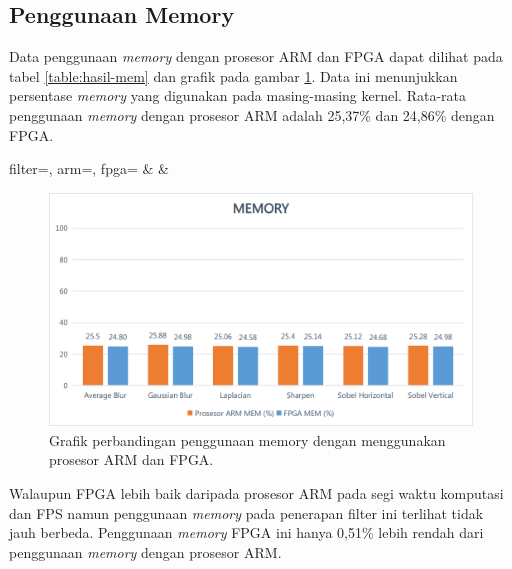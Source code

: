\subsection{Penggunaan Memory}
Data penggunaan \textit{memory} dengan prosesor ARM dan FPGA dapat dilihat pada tabel \ref{table:hasil-mem} dan grafik pada gambar \ref{fig:chart-mem}. Data ini menunjukkan persentase \textit{memory} yang digunakan pada masing-masing kernel. Rata-rata penggunaan \textit{memory} dengan prosesor ARM adalah 25,37\% dan 24,86\% dengan FPGA. 
\begin{atable}
    \caption{Tabel perbandingan penggunaan memory dengan menggunakan prosesor ARM dan FPGA.}
    \label{table:hasil-mem}
        {
            filter=\filter, 
            arm=\arm, 
            fpga=\fpga}
        {
            \filter & 
            \arm & 
            \fpga }
\end{atable}
\begin{figure}[H]
    \includegraphics[width=0.81\linewidth, center]{images/chart/chart-mem.png}
    \caption{Grafik perbandingan penggunaan memory dengan menggunakan prosesor ARM dan FPGA.}
    \label{fig:chart-mem}
\end{figure}
Walaupun FPGA lebih baik daripada prosesor ARM pada segi waktu komputasi dan FPS namun penggunaan \textit{memory} pada penerapan filter ini terlihat tidak jauh berbeda. Penggunaan \textit{memory} FPGA ini hanya 0,51\% lebih rendah dari penggunaan \textit{memory} dengan prosesor ARM.

